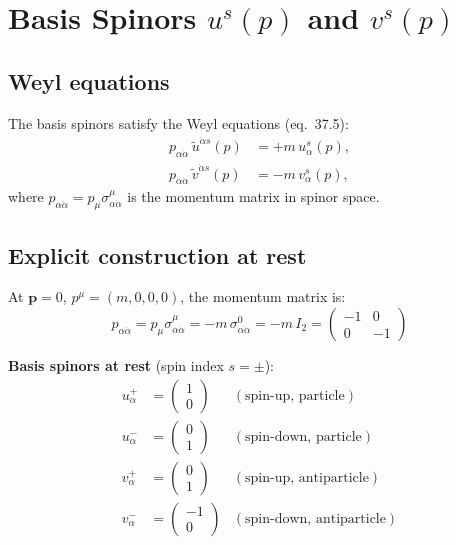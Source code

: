 \section{Basis Spinors \texorpdfstring{$u^s(p)$}{u} and \texorpdfstring{$v^s(p)$}{v}}

\subsection{Weyl equations}

The basis spinors satisfy the Weyl equations (eq.~37.5):
\begin{align}
  p_{\alpha\dot\alpha}\,\tilde u^{\dot\alpha s}(p) &= +m\,u^s_\alpha(p),
  \tag{37.5a}\\
  p_{\alpha\dot\alpha}\,\tilde v^{\dot\alpha s}(p) &= -m\,v^s_\alpha(p),
  \tag{37.5b}
\end{align}
where $p_{\alpha\dot\alpha} = p_\mu\sigma^\mu_{\alpha\dot\alpha}$ is the momentum matrix in spinor space.

\subsection{Explicit construction at rest}

At $\mathbf{p}=0$, $p^\mu = (m,0,0,0)$, the momentum matrix is:
\[
  p_{\alpha\dot\alpha} = p_\mu\sigma^\mu_{\alpha\dot\alpha}
  = -m\,\sigma^0_{\alpha\dot\alpha} = -m\,I_2
  = \begin{pmatrix}-1 & 0 \\ 0 & -1\end{pmatrix}
\]

\textbf{Basis spinors at rest} (spin index $s = \pm$):
\begin{align*}
  u^+_\alpha &= \begin{pmatrix}1 \\ 0\end{pmatrix} & (\text{spin-up, particle})\\
  u^-_\alpha &= \begin{pmatrix}0 \\ 1\end{pmatrix} & (\text{spin-down, particle})\\
  v^+_\alpha &= \begin{pmatrix}0 \\ 1\end{pmatrix} & (\text{spin-up, antiparticle})\\
  v^-_\alpha &= \begin{pmatrix}-1 \\ 0\end{pmatrix} & (\text{spin-down, antiparticle})
\end{align*}


